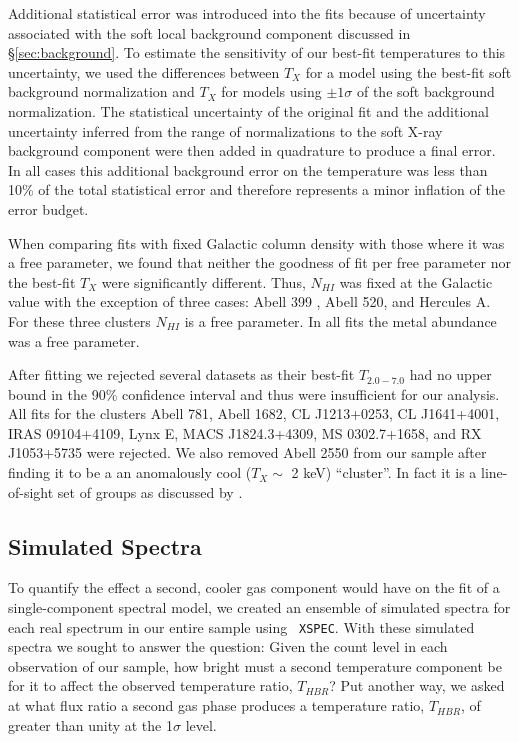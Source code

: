 \documentclass{emulateapj}
\begin{document}
Additional statistical error was introduced into the fits because of
uncertainty associated with the soft local background component
discussed in \S\ref{sec:background}. To estimate the sensitivity of
our best-fit temperatures to this uncertainty, we used the differences
between $T_{X}$ for a model using the best-fit soft background
normalization and $T_{X}$ for models using $\pm1\sigma$ of the soft
background normalization. The statistical uncertainty of the original
fit and the additional uncertainty inferred from the range of
normalizations to the soft X-ray background component were then added
in quadrature to produce a final error. In all cases this additional
background error on the temperature was less than 10\% of the total
statistical error and therefore represents a minor inflation of the
error budget.

When comparing fits with fixed Galactic column density with those
where it was a free parameter, we found that neither the goodness of
fit per free parameter nor the best-fit $T_{X}$ were significantly
different. Thus, $N_{HI}$ was fixed at the Galactic value with the
exception of three cases: Abell 399 \citep{2004MNRAS.351.1439S}, Abell
520, and Hercules A. For these three clusters $N_{HI}$ is a free
parameter. In all fits the metal abundance was a free parameter.

After fitting we rejected several datasets as their best-fit $T_{2.0-7.0}$
had no upper bound in the 90\% confidence interval and thus were
insufficient for our analysis. All fits for the clusters Abell 781,
Abell 1682, CL J1213+0253, CL J1641+4001, IRAS 09104+4109, Lynx E,
MACS J1824.3+4309, MS 0302.7+1658, and RX J1053+5735 were rejected. We
also removed Abell 2550 from our sample after finding it to be a an
anomalously cool ($T_{X} \sim$ 2 keV) ``cluster''. In fact it is a
line-of-sight set of groups as discussed by
\cite{2004cgpc.sympE..31M}.

\subsection{Simulated Spectra}\label{sec:simulated}

To quantify the effect a second, cooler gas component would have on the fit
of a single-component spectral model, we created an ensemble of simulated
spectra for each real spectrum in our entire sample using {\tt
XSPEC}. With these simulated spectra we sought to answer the question:
Given the count level in each observation of our sample, how bright
must a second temperature component be for it to affect the observed
temperature ratio, $T_{HBR}$? Put another way, we asked at what flux
ratio a second gas phase produces a temperature ratio, $T_{HBR}$, of
greater than unity at the 1$\sigma$ level.
\end{document}
